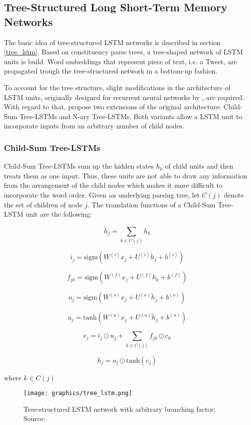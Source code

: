 \documentclass[a4paper,12pt]{article}%
\begin{document}
\subsection{Tree-Structured Long Short-Term Memory Networks}
The basic idea of tree-structured LSTM networks is described in section \ref{tree_lstm}. Based on constituency parse trees, a tree-shaped network of LSTM units is build. Word embeddings that represent piece of text, i.e. a Tweet, are propagated trough the tree-structured network in a bottom-up fashion.

To account for the tree structure, slight modifications in the architecture of LSTM units, originally designed for recurrent neural networks by \citet{Hochreiter1998}, are required. With regard to that, \citet{Tai2015} propose two extensions of the original architecture: Child-Sum Tree-LSTMs and N-ary Tree-LSTMs. Both variants allow a LSTM unit to incorporate inputs from an arbitrary number of child nodes.


\subsubsection{Child-Sum Tree-LSTMs}
Child-Sum Tree-LSTMs sum up the hidden states $h_k$ of child units and then treats them as one input. Thus, these units are not able to draw any information from the arrangement of the child nodes which makes it more difficult to incorporate the word order. Given an underlying parsing tree, let $C(j)$ denote the set of children of node $j$. The translation functions of a Child-Sum Tree-LSTM unit are the following:

$$
\tilde{h}_j = \sum_{k \in C(j)} h_k
$$

$$
i_j = \text{sigm} \left( W^{(i)} x_j + U^{(i)} \tilde{h}_j + b^{(i)} \right) 
$$

$$
f_{jk} = \text{sigm} \left( W^{(f)} x_j + U^{(f)} h_k + b^{(f)} \right) 
$$

$$
o_j = \text{sigm} \left( W^{(o)} x_j + U^{(o)} \tilde{h}_j + b^{(o)} \right) 
$$

$$
u_j = \text{tanh} \left( W^{(u)} x_j + U^{(u)} \tilde{h}_j + b^{(u)} \right) 
$$

$$
c_j = i_j \odot u_j + \sum_{k \in C(j)} f_{jk} \odot c_k
$$

$$
h_j = o_j \odot \text{tanh}(c_j)
$$

where $k \in C(j)$

\begin{figure}
\captionsetup{justification=centering}
\centering
\texttt{[image: graphics/tree\_lstm.png]}
\caption[Scematical Illustration Tree-structured LSTM network]{Tree-structured LSTM network with arbitrary branching factor; Source: \citet{Tai2015} \label{fig:sst}}
\end{figure}
\end{document}
